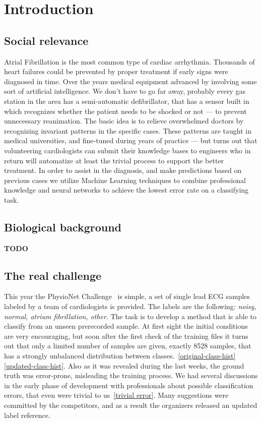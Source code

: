 \chapter{Introduction}


\section{Social relevance}
Atrial Fibrillation is the most common type of cardiac arrhythmia.
Thousands of heart failures could be prevented by proper treatment if early signs were diagnosed in time.
Over the years medical equipment advanced by involving some sort of artificial intelligence.
We don't have to go far away, probably every gas station in the area has a semi-automatic defibrillator, that has a sensor built in which recognizes whether the patient needs to be shocked or not --- to prevent unnecessary reanimation.
The basic idea is to relieve overwhelmed doctors by recognizing invariant patterns in the specific cases.
These patterns are taught in medical universities, and fine-tuned during years of practice --- but turns out that volunteering cardiologists can submit their knowledge bases to engineers who in return will automatize at least the trivial process to support the better treatment.
In order to assist in the diagnosis, and make predictions based on previous cases we utilize Machine Learning techniques to combine professional knowledge and neural networks to achieve the lowest error rate on a classifying task.

\section{Biological background}
\textbf{TODO}

\section{The real challenge}
This year the PhysioNet Challenge~\cite{physionet} is simple, a set of single lead ECG samples labeled by a team of cardiologists is provided. The labels are the following: \textit{noisy, normal, atrium fibrillation, other}. The task is to develop a method that is able to classify from an unseen prerecorded sample.
At first sight the initial conditions are very encouraging, but soon after the first check of the training files it turns out that only a limited number of samples are given, exactly 8528 samples, that has a strongly unbalanced distribution between classes.~\ref{original-class-hist}
\ref{updated-class-hist}.
Also as it was revealed during the last weeks, the ground truth was error-prone, misleading the training process.
We had several discussions in the early phase of development with professionals about possible classification errors, that even were trivial to us~\ref{trivial error}. Many suggestions were committed by the competitors, and as a result the organizers released an updated label reference.
